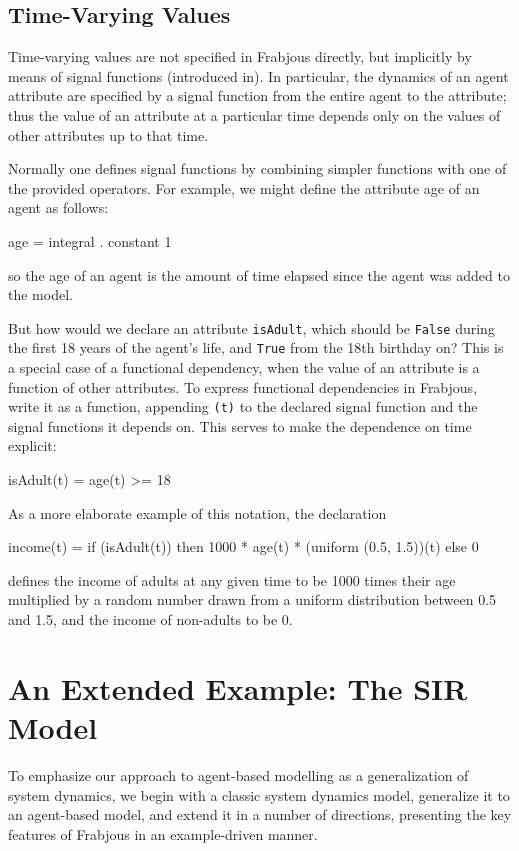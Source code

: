 \documentclass{llncs}
\begin{document}
\subsection{Time-Varying Values}

Time-varying values are not specified in Frabjous directly, but implicitly by means of signal functions (introduced in). In particular, the dynamics of an agent attribute are specified by a signal function from the entire agent to the attribute; thus the value of an attribute at a particular time depends only on the values of other attributes up to that time. 

   Normally one defines signal functions by combining simpler functions with one of the provided operators. For example, we might define the attribute age of an agent as follows: 
\begin{code}
 age = integral . constant 1
\end{code}
so the age of an agent is the amount of time elapsed since the agent was added to the model.

   But how would we declare an attribute \lstinline{isAdult}, which should be  \lstinline{False} during the first 18 years of the agent's life, and  \lstinline{True} from the 18th birthday on? This is a special case of a functional dependency, when the value of an attribute is a function of other attributes.  To express functional dependencies in Frabjous, write it as a function, appending \lstinline{(t)} to the declared signal function and the signal functions it depends on. This serves to make the dependence on time explicit: 
\begin{code}
 isAdult(t) = age(t) >= 18
\end{code}

As a more elaborate example of this notation, the declaration
\begin{code}
income(t) = if (isAdult(t)) 
    		   then 1000 * age(t) * (uniform (0.5, 1.5))(t)
                   else 0 
\end{code}
defines the income of adults at any given time to be 1000 times their age multiplied by a random number drawn from a uniform distribution between 0.5 and 1.5, and the income of non-adults to be 0.

\section{An Extended Example: The SIR Model}

To emphasize our approach to agent-based modelling as a generalization of system dynamics, we begin with a classic system dynamics model, generalize it to an agent-based model, and extend it in a number of directions, presenting the key features of Frabjous in an example-driven manner. 
\end{document}
